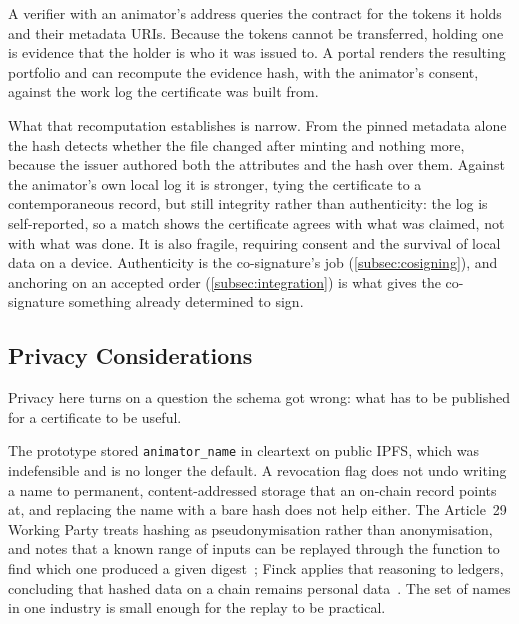 A verifier with an animator's address queries the contract for the tokens it holds
and their metadata URIs. Because the tokens cannot be transferred, holding one is
evidence that the holder is who it was issued to. A portal renders the resulting
portfolio and can recompute the evidence hash, with the animator's consent,
against the work log the certificate was built from.

What that recomputation establishes is narrow. From the pinned metadata alone the
hash detects whether the file changed after minting and nothing more, because the
issuer authored both the attributes and the hash over them. Against the animator's own
local log it is stronger, tying the certificate to a contemporaneous record, but still
integrity rather than authenticity: the log is self-reported, so a match shows the
certificate agrees with what was claimed, not with what was done. It is also fragile,
requiring consent and the survival of local data on a device. Authenticity is the
co-signature's job (\cref{subsec:cosigning}), and anchoring on an accepted order
(\cref{subsec:integration}) is what gives the co-signature something already
determined to sign.

\subsection{Privacy Considerations}
\label{subsec:privacy}

Privacy here turns on a question the schema got wrong: what has to be published for
a certificate to be useful.

The prototype stored \texttt{animator\_name} in cleartext on public IPFS, which was
indefensible and is no longer the default. A revocation flag does not undo writing a
name to permanent, content-addressed storage that an on-chain record points at, and
replacing the name with a bare hash does not help either. The Article~29 Working Party
treats hashing as pseudonymisation rather than anonymisation, and notes that a known
range of inputs can be replayed through the function to find which one produced a given
digest~\cite{art29wp2014anonymisation}; Finck applies that reasoning to ledgers,
concluding that hashed data on a chain remains personal
data~\cite{finck2018blockchains,finck2019stoa}. The set of names in one industry is
small enough for the replay to be practical.

